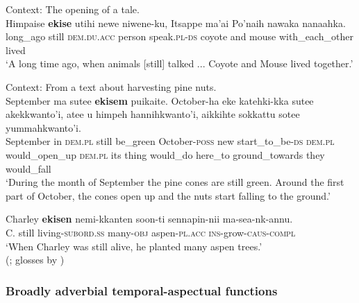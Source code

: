 \begin{exe}
	\ex\label{exAppendixShoshoni1}
	Context: The opening of a tale.\\
	\gll Himpaise \textbf{ekise} utihi newe niwene-ku, Itsappe ma'ai Po’naih nawaka nanaahka.\\
	long\_ago still \textsc{dem}.\textsc{du}.\textsc{acc} person speak.\textsc{pl}-\textsc{ds} coyote and mouse with\_each\_other lived\\
	\glt \lq A long time ago, when animals [still] talked ... Coyote and Mouse lived together.' \parencite[200, 202, 204]{CrumDayley1993}	

	\ex\label{exAppendixShoshoni2}
	Context: From a text about harvesting pine nuts.\\
	\gll September ma sutee \textbf{ekisem} puikaite. October-ha eke katehki-kka sutee akekkwanto’i, atee u himpeh hannihkwanto’i, aikkihte sokkattu sotee yummahkwanto’i.\\
	September in \textsc{dem}.\textsc{pl} still be\_green October-\textsc{poss} new start\_to\_be-\textsc{ds} \textsc{dem}.\textsc{pl} would\_open\_up \textsc{dem}.\textsc{pl} its thing would\_do here\_to ground\_towards they would\_fall\\
	\glt \lq During the month of September the pine cones are still green. Around the first part of October, the cones open up and the nuts start falling to the ground.' \parencite[209, 211, 214]{CrumDayley1993}
	
	\ex\label{exAppendixShoshoni3}
	\gll Charley \textbf{ekisen} nemi-kkanten soon-ti sennapin-nii ma-sea-nk-annu.\\
	C. still living-\textsc{subord}.\textsc{ss} many-\textsc{obj} aspen-\textsc{pl}.\textsc{acc} \textsc{ins}-grow-\textsc{caus}-\textsc{compl}\\
	\glt \lq When Charley was still alive, he planted many aspen trees.'
	\\(\cite[41]{CrumDayley1993}; glosses by \cite[66]{McLaughlin2012})

\end{exe}

\subsubsection{Broadly adverbial temporal-aspectual functions}
